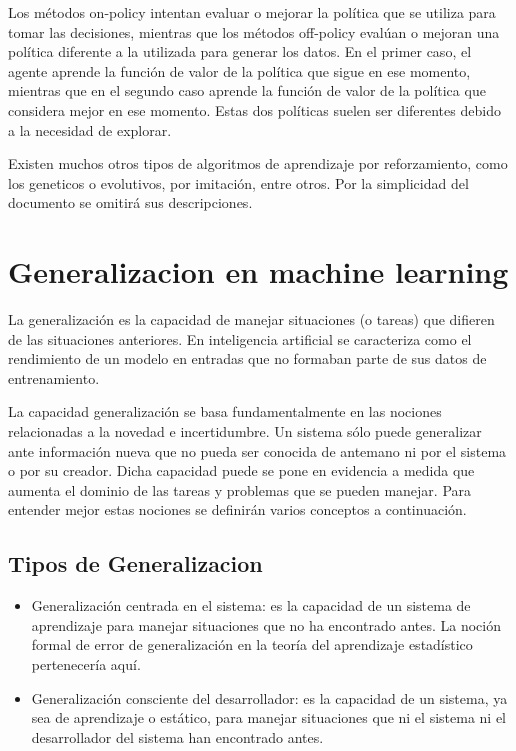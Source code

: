 Los métodos on-policy intentan evaluar o mejorar la política que se utiliza para tomar las decisiones, mientras que los métodos off-policy evalúan o mejoran una política diferente a la utilizada para generar los datos. En el primer caso, el agente aprende la función de valor de la política que sigue en ese momento, mientras que en el segundo caso aprende la función de valor de la política que considera mejor en ese momento. Estas dos políticas suelen ser diferentes debido a la necesidad de explorar.

Existen muchos otros tipos de algoritmos de aprendizaje por reforzamiento, como los geneticos o evolutivos, por imitación, entre otros. Por la simplicidad del documento se omitirá sus descripciones.

\section{Generalizacion en machine learning}\label{section:state-of-the-art:generalization-on-machine-learning}

La generalización es la capacidad de manejar situaciones (o tareas) que difieren de las situaciones anteriores. En inteligencia artificial se caracteriza como el rendimiento de un modelo en entradas que no formaban parte de sus datos de entrenamiento.

La capacidad generalización se basa fundamentalmente en las nociones relacionadas a la novedad e incertidumbre. Un sistema sólo puede generalizar ante información nueva que no pueda ser conocida de antemano ni por el sistema o por su creador. Dicha capacidad puede se pone en evidencia a medida que aumenta el dominio de las tareas y problemas que se pueden manejar. Para entender mejor estas nociones se definirán varios conceptos a continuación.

\subsection{Tipos de Generalizacion}

\begin{itemize}
\item Generalización centrada en el sistema: es la capacidad de un sistema de aprendizaje para manejar situaciones que no ha encontrado antes. La noción formal de error de generalización en la teoría del aprendizaje estadístico pertenecería aquí.

\item Generalización consciente del desarrollador: es la capacidad de un sistema, ya sea de aprendizaje o estático, para manejar situaciones que ni el sistema ni el desarrollador del sistema han encontrado antes.
\end{itemize}
